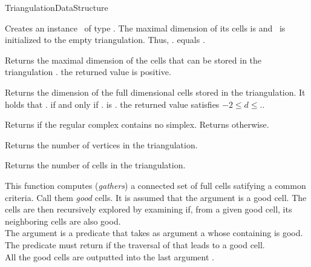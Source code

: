 \begin{ccRefConcept}{TriangulationDataStructure}
\ccGlue
{}

\ccCreation
{}

 {Creates an instance \ccVar\ of
type \ccRefName. The maximal dimension of its cells is  and
\ccVar\ is initialized to the empty triangulation. Thus,
\ccVar. equals .}



 { Returns the maximal dimension of
the cells that can be stored in the triangulation \ccVar. \ccPostcond the
returned value is positive. }

 { Returns the dimension of the
full dimensional cells stored in the triangulation. It holds that
\ccVar. if and only if \ccVar. is
. \ccPostcond the returned value  satisfies 
$-2\leq d \leq$\ccVar.. }

 { Returns  if the regular complex
contains no simplex. Returns  otherwise. }

{Returns the number of vertices in the triangulation.}

{Returns the number of cells  in the triangulation.}

{}

{}

{This function computes (\emph{gathers}) a connected set of full cells
satifying a common criteria. Call them \emph{good} cells. It is assumed
that the argument  is a good cell. The cells are then
recursively explored by examining if, from a given good cell, its neighboring
cells are also good.\\
The argument  is a predicate that takes as argument a 
whose containing  is good. The predicate must return 
if the traversal of that  leads to a good cell.\\
All the good cells are outputted into the last argument .}


\end{ccRefConcept}
